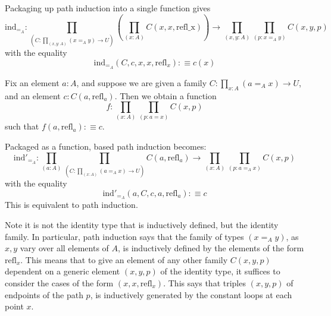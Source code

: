 Packaging up path induction into a single function gives \begin{equation*}
    \text{ind}_{=_A}:\prod_{(C:\prod_{(x,y:A)}(x=_Ay)\rightarrow U)}\left(\prod_{(x:A)}C(x,x,\text{refl_x})\right)\rightarrow \prod_{(x,y:A)}\prod_{(p:x=_Ay)}C(x,y,p)
\end{equation*}
with the equality \begin{equation*}
    \text{ind}_{=_A}(C,c,x,x,\text{refl}_x) :\equiv c(x)
\end{equation*}

\begin{theorem}
    Fix an element $a:A$, and suppose we are given a family $C:\prod_{x:A}(a=_Ax)\rightarrow U$, and an element $c:C(a,\text{refl}_a)$. Then we obtain a function $$f:\prod_{(x:A)}\prod_{(p:a=x)}C(x,p)$$
    such that $f(a,\text{refl}_a) :\equiv c$.
\end{theorem}

Packaged as a function, based path induction becomes: \begin{equation*}
    \text{ind}'_{=_A}:\prod_{(a:A)}\prod_{(C:\prod_{(x:A)}(a=_Ax)\rightarrow U)}C(a,\text{refl}_a)\rightarrow \prod_{(x:A)}\prod_{(p:a=_Ax)}C(x,p)
\end{equation*}
with the equality $$\text{ind}'_{=_A}(a,C,c,a,\text{refl}_a) :\equiv c$$
This is equivalent to path induction. 


\begin{remark}
    Note it is not the identity type that is inductively defined, but the identity family. In particular, path induction says that the family of types $(x=_Ay)$, as $x,y$ vary over all elements of $A$, is inductively defined by the elements of the form $\text{refl}_x$. This means that to give an element of any other family $C(x,y,p)$ dependent on a generic element $(x,y,p)$ of the identity type, it suffices to consider the cases of the form $(x,x,\text{refl}_x)$. This says that triples $(x,y,p)$ of endpoints of the path $p$, is inductively generated by the constant loops at each point $x$.
\end{remark}


